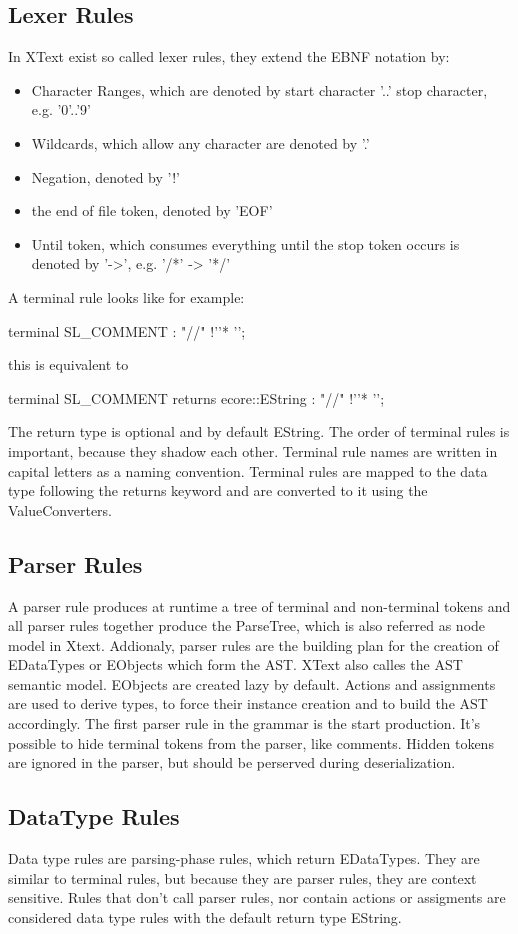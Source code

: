 \subsection{Lexer Rules}
In XText exist so called lexer rules,  they extend the EBNF notation by:
\begin{itemize}
	\item Character Ranges, which are denoted by start character '..' stop character, e.g. '0'..'9' 
	\item Wildcards, which allow any character are denoted by '.'
	\item Negation, denoted by '!'
	\item the end of file token, denoted by 'EOF'
	\item Until token, which consumes everything until the stop token occurs is denoted by '->', e.g. '/*' -> '*/'
\end{itemize}
A terminal rule looks like for example:
\begin{xtxt}
terminal SL_COMMENT : "//" !'\n'* '\n';
\end{xtxt}
this is equivalent to 
\begin{xtxt}
terminal SL_COMMENT returns ecore::EString : "//" !'\n'* '\n';
\end{xtxt}
The return type is optional and by default EString. The order of terminal rules is important, because they shadow each other. Terminal rule names are written in capital letters as a naming convention. Terminal rules are mapped to the data type following the returns keyword and are converted to it using the ValueConverters.

\subsection{Parser Rules}
A parser rule produces at runtime a tree of terminal and non-terminal tokens and all parser rules together produce the ParseTree, which is also referred as node model in Xtext. Addionaly, parser rules are the building plan for the creation of EDataTypes or EObjects which form the AST. XText also calles the AST semantic model. EObjects are created lazy by default. Actions and assignments are used to derive types, to force their instance creation and to build the AST accordingly. The first parser rule in the grammar is the start production. It's possible to hide terminal tokens from the parser, like comments. Hidden tokens are ignored in the parser, but should be perserved during deserialization.

\subsection{DataType Rules}
Data type rules are parsing-phase rules, which return EDataTypes. They are similar to terminal rules, but because they are parser rules, they are context sensitive. Rules that don't call parser rules, nor contain actions or assigments are considered data type rules with the default return type EString. 
\begin{xtxt}
Number returns ecore::EInt : NUM ('.' NUM*)?;}
\end{xtxt}


